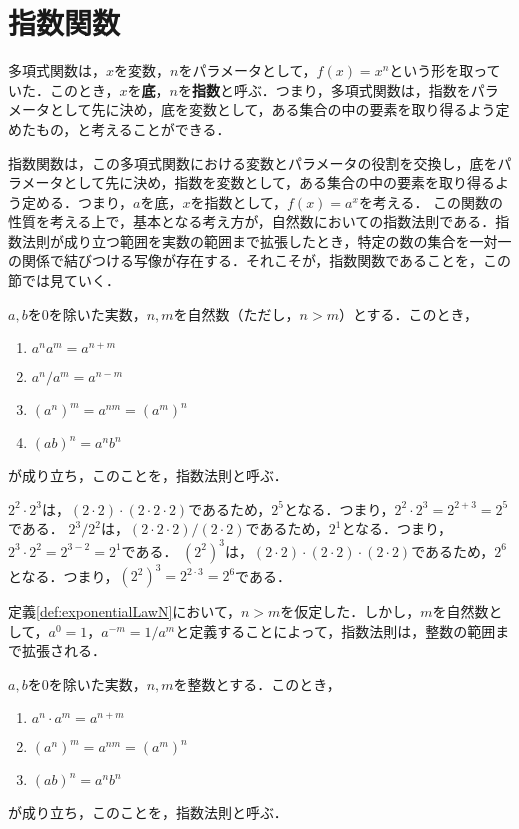 \section{指数関数}
多項式関数は，$x$を変数，$n$をパラメータとして，$f(x) = x^n$という形を取っていた．このとき，$x$を\textbf{底}，$n$を\textbf{指数}と呼ぶ．つまり，多項式関数は，指数をパラメータとして先に決め，底を変数として，ある集合の中の要素を取り得るよう定めたもの，と考えることができる．

指数関数は，この多項式関数における変数とパラメータの役割を交換し，底をパラメータとして先に決め，指数を変数として，ある集合の中の要素を取り得るよう定める．つまり，$a$を底，$x$を指数として，$f(x) = a^x$を考える．
この関数の性質を考える上で，基本となる考え方が，自然数においての指数法則である．指数法則が成り立つ範囲を実数の範囲まで拡張したとき，特定の数の集合を一対一の関係で結びつける写像が存在する．それこそが，指数関数であることを，この節では見ていく．

\begin{definition}[自然数における指数法則]
	\label{def:exponentialLawN}%
	$a, b$を$0$を除いた実数，$n, m$を自然数（ただし，$n > m$）とする．このとき，
	\begin{enumerate}[1.]
		\item $a^na^m = a^{n+m}$
		\item $a^n / a^m = a^{n-m}$
		\item $\left(a^n\right)^m = a^{nm} = \left(a^m\right)^n$
		\item $\left(ab\right)^n = a^nb^n$
	\end{enumerate}
	が成り立ち，このことを，指数法則と呼ぶ．
\end{definition}
\begin{example*}
	$2^2\cdot 2^3$は，$(2\cdot2)\cdot(2\cdot2\cdot2)$であるため，$2^5$となる．つまり，$2^2\cdot2^3 = 2^{2+3} = 2^5$である．
	$2^3/2^2$は，$(2\cdot2\cdot2)/(2\cdot2)$であるため，$2^1$となる．つまり，$2^3\cdot2^2 = 2^{3-2} = 2^1$である．
	$\left(2^2\right)^3$は，$(2\cdot2)\cdot(2\cdot2)\cdot(2\cdot2)$であるため，$2^6$となる．つまり，$\left(2^2\right)^3 = 2^{2\cdot3} = 2^6$である．
\end{example*}

定義\ref{def:exponentialLawN}において，$n > m$を仮定した．しかし，$m$を自然数として，$a^0 = 1$，$a^{-m} = 1/a^m$と定義することによって，指数法則は，整数の範囲まで拡張される．

\begin{definition}[整数における指数法則]
	\label{def:exponentialLawZ}%
	$a, b$を$0$を除いた実数，$n, m$を整数とする．このとき，
	\begin{enumerate}[1.]
		\item $a^n\cdot a^m = a^{n+m}$
		\item $\left(a^n\right)^m = a^{nm} = \left(a^m\right)^n$
		\item $\left(ab\right)^n = a^nb^n$
	\end{enumerate}
	が成り立ち，このことを，指数法則と呼ぶ．
\end{definition}

